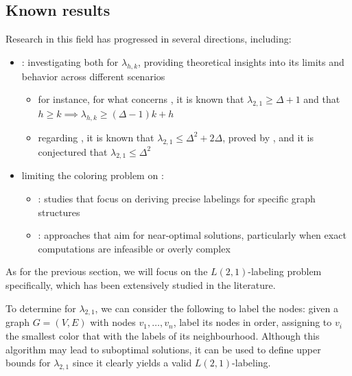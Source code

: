 \documentclass[a4paper, 12pt]{report}
\begin{document}
    \subsection{Known results}

    Research in this field has progressed in several directions, including:

    \begin{itemize}
        \item {}: investigating both  for $\lambda_{h, k}$, providing theoretical insights into its limits and behavior across different scenarios
            \begin{itemize}
                \item for instance, for what concerns , it is known that $\lambda_{2,1} \ge \Delta + 1$ and that $h \ge k \implies \lambda_{h, k} \ge (\Delta - 1) k + h$
                \item regarding , it is known that $\lambda_{2, 1} \le \Delta^2 + 2 \Delta$, proved by \textcite{griggs}, and it is conjectured that $\lambda_{2,1} \le \Delta^2$
            \end{itemize}
        \item limiting the coloring problem on :
            \begin{itemize}
                \item {}: studies that focus on deriving precise labelings for specific graph structures
                \item {}: approaches that aim for near-optimal solutions, particularly when exact computations are infeasible or overly complex
            \end{itemize}
    \end{itemize}

    As for the previous section, we will focus on the $L(2,1)$-labeling problem specifically, which has been extensively studied in the literature.

    To determine  for $\lambda_{2,1}$, we can consider the following  to label the nodes: given a graph $G = (V, E)$ with nodes $v_1, \ldots, v_n$, label its nodes in order, assigning to $v_i$ the smallest color that  with the labels of its neighbourhood. Although this algorithm may lead to suboptimal solutions, it can be used to define upper bounds for $\lambda_{2, 1}$ since it clearly yields a valid $L(2,1)$-labeling.
\end{document}
